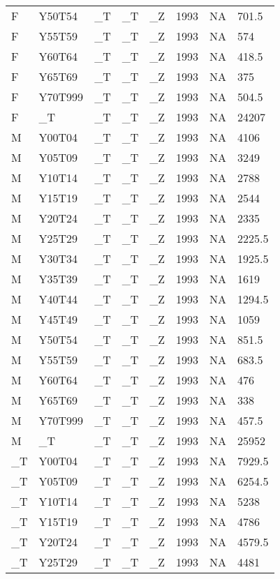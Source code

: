 \begin{longtable}[t]{llllllll}
F & Y50T54 & \_T & \_T & \_Z & 1993 & NA & 701.5\\
\addlinespace
F & Y55T59 & \_T & \_T & \_Z & 1993 & NA & 574\\
F & Y60T64 & \_T & \_T & \_Z & 1993 & NA & 418.5\\
F & Y65T69 & \_T & \_T & \_Z & 1993 & NA & 375\\
F & Y70T999 & \_T & \_T & \_Z & 1993 & NA & 504.5\\
F & \_T & \_T & \_T & \_Z & 1993 & NA & 24207\\
\addlinespace
M & Y00T04 & \_T & \_T & \_Z & 1993 & NA & 4106\\
M & Y05T09 & \_T & \_T & \_Z & 1993 & NA & 3249\\
M & Y10T14 & \_T & \_T & \_Z & 1993 & NA & 2788\\
M & Y15T19 & \_T & \_T & \_Z & 1993 & NA & 2544\\
M & Y20T24 & \_T & \_T & \_Z & 1993 & NA & 2335\\
\addlinespace
M & Y25T29 & \_T & \_T & \_Z & 1993 & NA & 2225.5\\
M & Y30T34 & \_T & \_T & \_Z & 1993 & NA & 1925.5\\
M & Y35T39 & \_T & \_T & \_Z & 1993 & NA & 1619\\
M & Y40T44 & \_T & \_T & \_Z & 1993 & NA & 1294.5\\
M & Y45T49 & \_T & \_T & \_Z & 1993 & NA & 1059\\
\addlinespace
M & Y50T54 & \_T & \_T & \_Z & 1993 & NA & 851.5\\
M & Y55T59 & \_T & \_T & \_Z & 1993 & NA & 683.5\\
M & Y60T64 & \_T & \_T & \_Z & 1993 & NA & 476\\
M & Y65T69 & \_T & \_T & \_Z & 1993 & NA & 338\\
M & Y70T999 & \_T & \_T & \_Z & 1993 & NA & 457.5\\
\addlinespace
M & \_T & \_T & \_T & \_Z & 1993 & NA & 25952\\
\_T & Y00T04 & \_T & \_T & \_Z & 1993 & NA & 7929.5\\
\_T & Y05T09 & \_T & \_T & \_Z & 1993 & NA & 6254.5\\
\_T & Y10T14 & \_T & \_T & \_Z & 1993 & NA & 5238\\
\_T & Y15T19 & \_T & \_T & \_Z & 1993 & NA & 4786\\
\addlinespace
\_T & Y20T24 & \_T & \_T & \_Z & 1993 & NA & 4579.5\\
\_T & Y25T29 & \_T & \_T & \_Z & 1993 & NA & 4481\\

\end{longtable}
